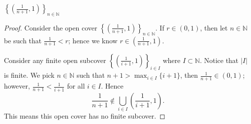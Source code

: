 \begin{Exercise}
	\begin{answer}
		$\left\{ \left(\frac{1}{n+1},1\right) \right\}_{n\in\mathbb{N}}$
	\end{answer}
	\begin{proof}
		Consider the open cover $\left\{ \left(\frac{1}{n+1},1\right) \right\}_{n\in\mathbb{N}}$. If $r\in(0,1)$, then let $n\in\mathbb{N}$ be such that $\frac{1}{n+1}<r$; hence we know $r\in\left( \frac{1}{n+1},1 \right)$.
		
		Consider any finite open subcover $\left\{ \left(\frac{1}{i+1},1\right) \right\}_{i\in I}$ where $I\subset \mathbb{N}$. Notice that $|I|$ is finite. We pick $n\in\mathbb{N}$ such that $n+1>\max_{i\in I}\{i+1\}$, then $\frac{1}{n+1}\in(0,1)$; however, $\frac{1}{n+1} < \frac{1}{i+1}$ for all $i\in I$. Hence
		$$
		\frac{1}{n+1} \notin \bigcup_{i\in I}\left(\frac{1}{i+1},1\right).
		$$
		This means this open cover has no finite subcover.
	\end{proof}
\end{Exercise}
